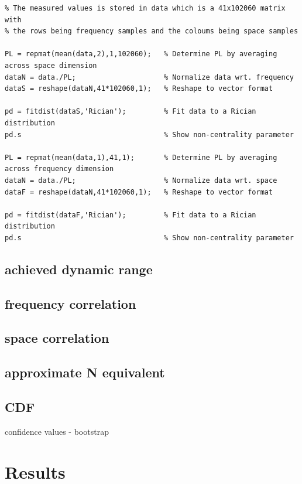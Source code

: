 \begin{lstlisting}
% The measured values is stored in data which is a 41x102060 matrix with
% the rows being frequency samples and the coloums being space samples

PL = repmat(mean(data,2),1,102060);   % Determine PL by averaging across space dimension 
dataN = data./PL;                     % Normalize data wrt. frequency
dataS = reshape(dataN,41*102060,1);   % Reshape to vector format

pd = fitdist(dataS,'Rician');         % Fit data to a Rician distribution
pd.s                                  % Show non-centrality parameter

PL = repmat(mean(data,1),41,1);       % Determine PL by averaging across frequency dimension
dataN = data./PL;                     % Normalize data wrt. space
dataF = reshape(dataN,41*102060,1);   % Reshape to vector format

pd = fitdist(dataF,'Rician');         % Fit data to a Rician distribution
pd.s                                  % Show non-centrality parameter
\end{lstlisting}

 

\subsection{achieved dynamic range}
\subsection{frequency correlation}


\subsection{space correlation}
\subsection{approximate N equivalent}
\subsection{CDF}
confidence values - bootstrap

\section{Results}